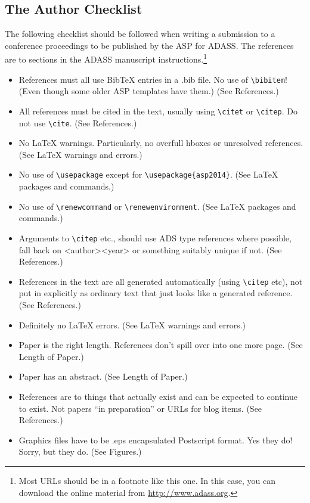 \documentclass[11pt,twoside]{article}
\begin{document}
\subsection{The Author Checklist}
The following checklist should be followed when writing a submission to a conference proceedings to be published by the ASP for ADASS. The references are to sections in the ADASS manuscript instructions.\footnote{Most URLs should be in a footnote like this one.  In this case, you can download the online material from \url{http://www.adass.org}.} 

\begin{itemize}
\checklistitemize

\item References must all use BibTeX entries in a .bib file. No use of \verb"\bibitem"! (Even though some older ASP templates have them.) (See References.)
\item All references must be cited in the text, usually using \verb"\citet" or \verb"\citep".  Do not use \verb"\cite". (See References.)
\item No LaTeX warnings. Particularly, no overfull hboxes or unresolved references. (See LaTeX warnings and errors.)
\item No use of \verb"\usepackage" except for \verb"\usepackage{asp2014}". (See LaTeX packages and commands.)
\item No use of \verb"\renewcommand" or \verb"\renewenvironment". (See LaTeX packages and commands.)
\item Arguments to \verb"\citep" etc., should use ADS type references where possible, fall back on <author><year> or something suitably unique if not. (See References.)
\item References in the text are all generated automatically (using \verb"\citep" etc), not put in explicitly as ordinary text that just looks like a generated reference. (See References.)
\item Definitely no LaTeX errors. (See LaTeX warnings and errors.)
\item Paper is the right length. References don't spill over into one more page. (See Length of Paper.)
\item Paper has an abstract. (See Length of Paper.)
\item References are to things that actually exist and can be expected to continue to exist. Not papers ``in preparation'' or URLs for blog items. (See References.)
\item Graphics files have to be .eps encapsulated Postscript format. Yes they do! Sorry, but they do. (See Figures.)

\end{itemize}
\end{document}
